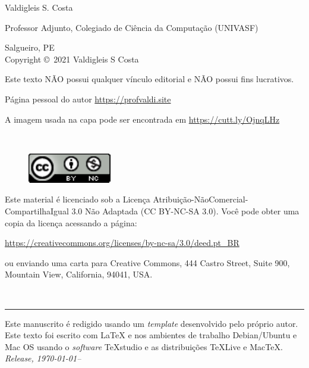 \newpage
\noindent Valdigleis S. Costa

\noindent Professor Adjunto, Colegiado de Ciência da Computação (UNIVASF)

\noindent Salgueiro, PE\\

\noindent Copyright \copyright\ 2021 Valdigleis S Costa

\noindent Este texto  \textsc{NÃO}  possui qualquer vínculo editorial e \textsc{NÃO} possui fins lucrativos.

\noindent Página pessoal do autor \url{https://profvaldi.site}

\noindent A imagem usada na capa pode ser encontrada em \url{https://cutt.ly/OjnqLHz}

~\vfill

\thispagestyle{empty}


\begin{figure}[h]
	\centering
	\includegraphics[width=0.15\linewidth]{figures/license}
\end{figure}
\noindent Este material é licenciado sob a Licença Atribuição-NãoComercial-CompartilhaIgual 3.0 Não Adaptada (CC BY-NC-SA 3.0).  Você pode obter uma copia da licença acessando a página: 
\begin{center}
	\url{https://creativecommons.org/licenses/by-nc-sa/3.0/deed.pt_BR}
\end{center}
\noindent ou enviando uma carta para Creative Commons, 444 Castro Street, Suite 900, Mountain View, California, 94041, USA.

~\vfill

\thispagestyle{empty}

\hrule
\vspace*{1cm}

\noindent Este manuscrito é redigido usando um \textit{template} desenvolvido pelo próprio autor. Este texto foi escrito com {\LaTeX} e {\LaTeXe} nos ambientes de trabalho Debian/Ubuntu e Mac OS usando o \textit{software} TeXstudio e as distribuições  {\TeX}Live e Mac{\TeX}. \\ 

\noindent \textit{Release, \today--\currenttime} %
\newpage
